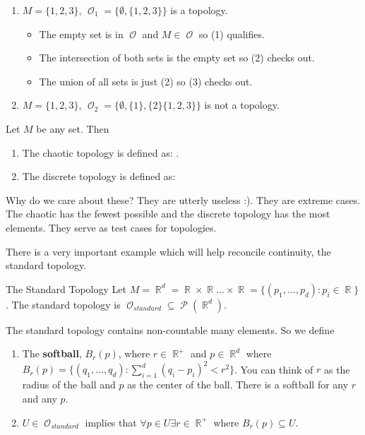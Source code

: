 \documentclass[a4paper, 11pt]{article}
\DeclareMathOperator{\Otop}{\mathcal{O}}
\DeclareMathOperator{\Pset}{\mathcal{P}}
\DeclareMathOperator{\R}{\mathbb{R}}
\begin{document}
\begin{example}
\begin{enumerate}
  \item $M = \{1, 2, 3\}$, $\Otop_1 = \{ \emptyset, \{1, 2, 3\} \}$ is a topology.
  \begin{itemize}
    \item The empty set is in $\Otop$ and $M \in \Otop$ so (1) qualifies.
    \item The intersection of both sets is the empty set so (2) checks out.
    \item The union of all sets is just (2) so (3) checks out.
  \end{itemize}
  \item $M = \{1, 2, 3\}$, $\Otop_2 = \{ \emptyset,\{1 \},\{ 2 \} \{1, 2, 3\} \}$ is not a topology.
\end{enumerate}
\end{example}

\begin{example}
Let $M$ be any set. Then
\begin{enumerate}
  \item The chaotic topology is defined as: \fbox{$\Otop_{chaotic} = \{\emptyset, M\}$}.
  \item The discrete topology is defined as: \fbox{$\Otop_{discrete} = \{\emptyset, \Pset(M)\}$}
\end{enumerate}
\end{example}

Why do we care about these? They are utterly useless :). They are extreme cases. The chaotic has the fewest possible 
and the discrete topology has the most elements. They serve as test cases for topologies.

There is a very important example which will help reconcile continuity, the standard topology.
\begin{definition}{The Standard Topology}
Let $M = \R^d = \R \times \R ... \times \R = \lbrace (p_1, ..., p_d): p_i \in \R \rbrace$. The standard topology is
$\Otop_{standard} \subseteq \Pset(\R^d)$.

The standard topology contains non-countable many elements. So we define
\begin{enumerate}
  \item The \textbf{softball}, $B_r(p)$, where $r \in \R^+$ and $p \in \R^d$ where 
  $B_r(p) = \lbrace (q_1, ..., q_d): \sum_{i = 1}^{d}(q_i - p_i)^2 < r^2 \rbrace$. You can think of $r$ as the radius of the
  ball and $p$ as the center of the ball. There is a softball for any $r$ and any $p$.
  \item $U \in \Otop_{standard}$ implies that $\forall p\in U \exists r \in \R^{+}$ where $B_r(p) \subseteq U$.
\end{enumerate}
\end{definition}
\end{document}
